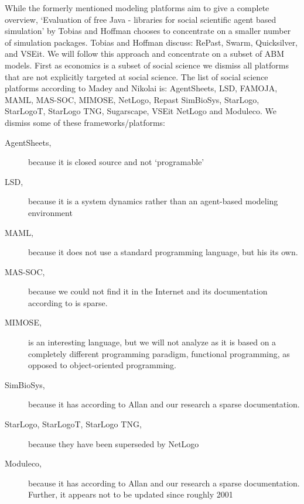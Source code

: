 \documentclass[letterpaper,10pt,english]{sphinxmanual}
\begin{document}
While the formerly mentioned modeling platforms aim to give a
complete overview, `Evaluation of free Java - libraries for
social scientific agent based simulation' \cite{Tobias2004}
by Tobias and Hoffman
chooses to concentrate on a smaller number of simulation packages.
Tobias and Hoffman discuss: RePast, Swarm, Quicksilver, and VSEit.
We will follow this approach and concentrate on a subset of
ABM models. First as economics is a subset of social science we
dismiss all platforms that are not explicitly targeted at
social science. The list of social science platforms according
to \cite{Societies2009} Madey and Nikolai is:
AgentSheets, LSD, FAMOJA, MAML, MAS-SOC,  MIMOSE, NetLogo, Repast
SimBioSys, StarLogo, StarLogoT, StarLogo TNG, Sugarscape, VSEit
NetLogo and  Moduleco.
We dismiss some of these frameworks/platforms:
\begin{description}
\item[{AgentSheets,}] \leavevmode
because it is closed source and not `programable'

\item[{LSD,}] \leavevmode
because it is a system dynamics rather than an agent-based modeling environment

\item[{MAML,}] \leavevmode
because it does not use a standard programming language, but his its own.

\item[{MAS-SOC,}] \leavevmode
because we could not find it in the Internet and its documentation
according to \cite{Allan2010} is sparse.

\item[{MIMOSE,}] \leavevmode
is an interesting language, but we will not analyze as it is based on a completely different
programming paradigm, functional programming, as opposed to object-oriented
programming.

\item[{SimBioSys,}] \leavevmode
because it has according to Allan \cite{Allan2010} and our research  a sparse documentation.

\item[{StarLogo, StarLogoT, StarLogo TNG,}] \leavevmode
because they have been superseded by NetLogo

\item[{Moduleco,}] \leavevmode
because it has  according to Allan \cite{Allan2010} and our research a sparse documentation.
Further, it appears not to be updated since roughly 2001

\end{description}
\end{document}
